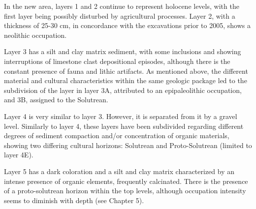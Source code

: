 \documentclass[12pt,twoside]{reedthesis}
\begin{document}
In the new area, layers 1 and 2 continue to represent holocene levels, with the first layer being possibly disturbed by agricultural processes. Layer 2, with a thickness of 25-30 cm, in concordance with the excavations prior to 2005, shows a neolithic occupation.

Layer 3 has a silt and clay matrix sediment, with some inclusions and showing interruptions of limestone clast depositional episodes, although there is the constant presence of fauna and lithic artifacts. As mentioned above, the different material and cultural characteristics within the same geologic package led to the subdivision of the layer in layer 3A, attributed to an epipaleolithic occupation, and 3B, assigned to the Solutrean.

Layer 4 is very similar to layer 3. However, it is separated from it by a gravel level. Similarly to layer 4, these layers have been subdivided regarding different degrees of sediment compaction and/or concentration of organic materials, showing two differing cultural horizons: Solutrean and Proto-Solutrean (limited to layer 4E).

Layer 5 has a dark coloration and a silt and clay matrix characterized by an intense presence of organic elements, frequently calcinated. There is the presence of a proto-solutrean horizon within the top levels, although occupation intensity seems to diminish with depth (see Chapter 5).
\end{document}

